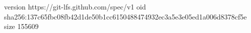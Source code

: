 version https://git-lfs.github.com/spec/v1
oid sha256:137c65fbc08fb42d1de50b1cc6150488474932ec3a5e3e05ed1a006d8378cf5e
size 155609
